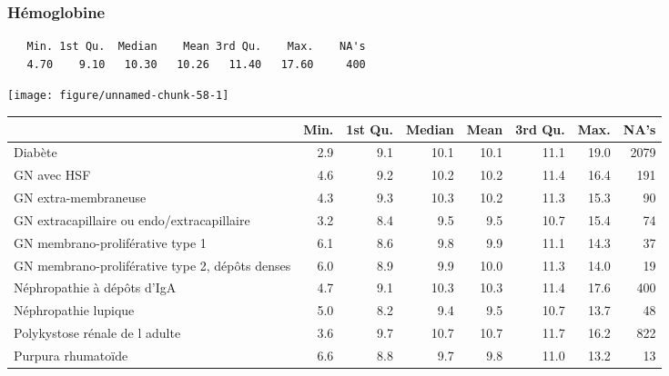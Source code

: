 \documentclass[11pt,a4paper]{article}\usepackage[]{graphicx}\usepackage[]{color}
\makeatletter
\def\maxwidth{ %
  \ifdim\Gin@nat@width>\linewidth
    \linewidth
  \else
    \Gin@nat@width
  \fi
}
\newenvironment{kframe}{%
 \def\at@end@of@kframe{}%
 \ifinner\ifhmode%
  \def\at@end@of@kframe{\end{minipage}}%
  \begin{minipage}{\columnwidth}%
 \fi\fi%
 \def\FrameCommand##1{\hskip\@totalleftmargin \hskip-\fboxsep
 \colorbox{shadecolor}{##1}\hskip-\fboxsep
     \hskip-\linewidth \hskip-\@totalleftmargin \hskip\columnwidth}%
 \MakeFramed {\advance\hsize-\width
   \@totalleftmargin\z@ \linewidth\hsize
   \@setminipage}}%
 {\par\unskip\endMakeFramed%
 \at@end@of@kframe}
\newenvironment{knitrout}{}{} %
\makeatother
\begin{document}
\subsubsection*{Hémoglobine}

\begin{knitrout}
\color{fgcolor}\begin{kframe}
\begin{verbatim}
   Min. 1st Qu.  Median    Mean 3rd Qu.    Max.    NA's 
   4.70    9.10   10.30   10.26   11.40   17.60     400 
\end{verbatim}
\end{kframe}
\texttt{[image: figure/unnamed-chunk-58-1]} 

\end{knitrout}

\begin{table}[ht]
\centering
\begin{tabular}{lrrrrrrr}
  \hline
 & Min. & 1st Qu. & Median & Mean & 3rd Qu. & Max. & NA's \\ 
  \hline
Diabète & 2.9 & 9.1 & 10.1 & 10.1 & 11.1 & 19.0 & 2079 \\ 
  GN avec HSF & 4.6 & 9.2 & 10.2 & 10.2 & 11.4 & 16.4 & 191 \\ 
  GN extra-membraneuse & 4.3 & 9.3 & 10.3 & 10.2 & 11.3 & 15.3 & 90 \\ 
  GN extracapillaire ou endo/extracapillaire & 3.2 & 8.4 & 9.5 & 9.5 & 10.7 & 15.4 & 74 \\ 
  GN membrano-proliférative type 1 & 6.1 & 8.6 & 9.8 & 9.9 & 11.1 & 14.3 & 37 \\ 
  GN membrano-proliférative type 2, dépôts denses & 6.0 & 8.9 & 9.9 & 10.0 & 11.3 & 14.0 & 19 \\ 
  Néphropathie à dépôts d'IgA & 4.7 & 9.1 & 10.3 & 10.3 & 11.4 & 17.6 & 400 \\ 
  Néphropathie lupique & 5.0 & 8.2 & 9.4 & 9.5 & 10.7 & 13.7 & 48 \\ 
  Polykystose rénale de l adulte & 3.6 & 9.7 & 10.7 & 10.7 & 11.7 & 16.2 & 822 \\ 
  Purpura rhumatoïde & 6.6 & 8.8 & 9.7 & 9.8 & 11.0 & 13.2 & 13 \\ 
   \hline
\end{tabular}
\end{table}
\end{document}
